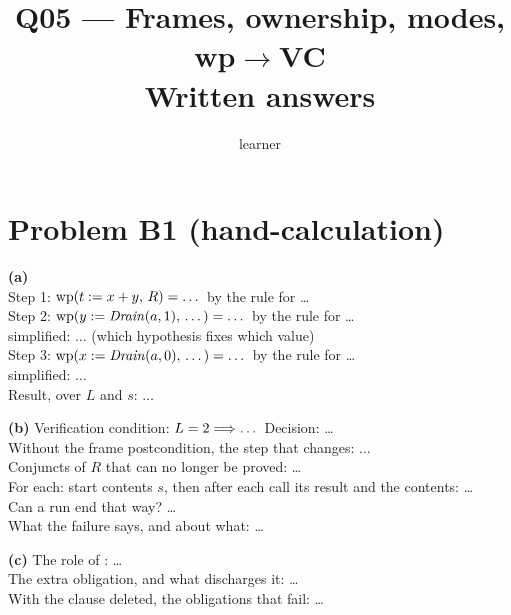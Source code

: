 \documentclass[11pt]{article}
\title{Q05 --- Frames, ownership, modes, wp$\to$VC \\ \large Written answers}
\author{learner}
\date{}
\begin{document}
\maketitle

\section*{Problem B1 (hand-calculation)}\label{ans:B1}
\begin{answer}
\textbf{(a)} \\
Step 1: $\mathrm{wp}(t \mathrel{:=} x + y,\,R) = \dots$ \quad by the rule for \dots \\
Step 2: $\mathrm{wp}(y \mathrel{:=} \mathit{Drain}(a, 1),\,\dots) = \dots$ \quad by the rule for \dots \\
\hspace*{2em} simplified: $\dots$ \quad (which hypothesis fixes which value) \\
Step 3: $\mathrm{wp}(x \mathrel{:=} \mathit{Drain}(a, 0),\,\dots) = \dots$ \quad by the rule for \dots \\
\hspace*{2em} simplified: $\dots$ \\
Result, over $L$ and $s$: $\dots$

\textbf{(b)} Verification condition: $L = 2 \Longrightarrow \dots$ \quad Decision: \dots \\
Without the frame postcondition, the step that changes: $\dots$ \\
Conjuncts of $R$ that can no longer be proved: \dots \\
For each: start contents $s$, then after each call its result and the contents: \dots \\
Can a run end that way? \dots \\
What the failure says, and about what: \dots

\textbf{(c)} The role of : \dots \\
The extra obligation, and what discharges it: \dots \\
With the  clause deleted, the obligations that fail: \dots
\end{answer}

\end{document}
